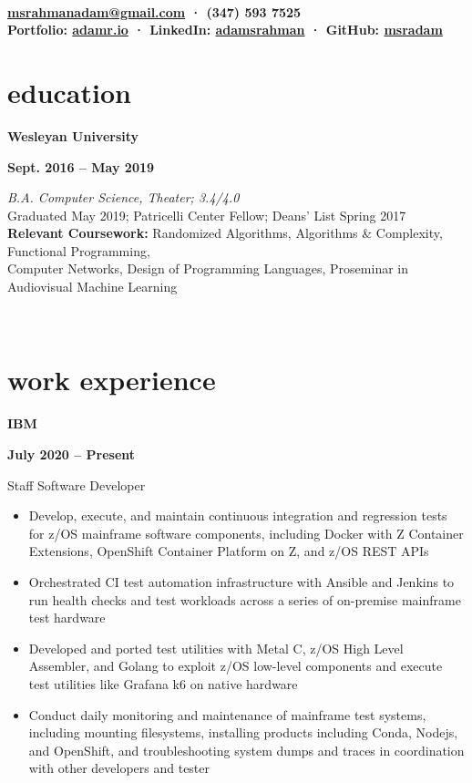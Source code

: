 \documentclass[letterpaper, 10.5pt]{article}
\author{Adam M. Rahman}
\makeatletter
\renewcommand{\maketitle}{
	\hspace{.125\textwidth}
	\begin{minipage}[t]{.75\textwidth}
    \begin{center}
        \fontsize{15pt}{15pt}\selectfont\bfseries \theauthor \\
        \fontsize{10pt}{15pt}\selectfont\normalfont
        \vspace{-0.5mm}
        \href{mailto:munawaradamr@gmail.com}{msrahmanadam@gmail.com} · (347) 593 7525 \\
        \vspace{-0.5mm}
        Portfolio: \href{https://adamr.io}{adamr.io} · 
        LinkedIn: \href{https://www.linkedin.com/in/adamsrahman/}{adamsrahman} · 
        GitHub: \href{https://github.com/msradam}{msradam}  \\ 
        \end{center}
    \end{minipage}}
\newcommand{\eduentry}[4]{
        \begin{minipage}[b]{0.5\textwidth}
        \raggedright
        \bf\large #2
        \end{minipage}%
        \begin{minipage}[b]{0.5\textwidth}
        \raggedleft
        \bf #1
        \end{minipage}

    \begin{minipage}[t]{.80\linewidth}
    \vspace{-3mm}
    \textit{#3} \small{#4}
    \end{minipage}\\
    \vspace{1mm}
    }
\newcommand{\expentry}[5]{

    \begin{minipage}[b]{0.5\textwidth}
        \raggedright
        \bf\large #3
        \end{minipage}%
        \begin{minipage}[b]{0.5\textwidth}
        \raggedleft
        \bf {#1} -- {#2}
        \end{minipage}

    \begin{minipage}[t]{\linewidth}
    \vspace{-3mm}
    #4
    \vspace{-1.75mm}
    \small{#5}
    \end{minipage}\\
    \vspace{1mm}
    }
\makeatother
\begin{document}
    \maketitle
    \vspace{.075cm}


    \section{education}
    \eduentry{Sept. 2016 -- May 2019}
    {Wesleyan University}
    {B.A. Computer Science, Theater; 3.4/4.0}
    {\\ Graduated May 2019; Patricelli Center Fellow; Deans' List Spring 2017\\
    \textbf{Relevant Coursework:} Randomized Algorithms, Algorithms \& Complexity, Functional Programming, \\ Computer Networks, Design of Programming Languages, Proseminar in Audiovisual Machine Learning}

    \section{work experience}
    \expentry{July 2020}
    {Present}
    {IBM}
    {Staff Software Developer}
    {
        \begin{itemize}
          \setlength\itemsep{-0.5mm}
            \item Develop, execute, and maintain continuous integration and regression tests
            for z/OS mainframe software components, including Docker with Z Container
            Extensions, OpenShift Container Platform on Z, and z/OS REST APIs
            \item Orchestrated CI test automation infrastructure with Ansible and Jenkins to run
            health checks and test workloads across a series of on-premise mainframe
            test hardware
            \item Developed and ported test utilities with Metal C, z/OS High Level Assembler, and Golang to exploit z/OS low-level components and execute test utilities like Grafana k6 on native hardware
            \item Conduct daily monitoring and maintenance of mainframe test systems,
            including mounting filesystems, installing products including Conda, Nodejs,
            and OpenShift, and troubleshooting system dumps and traces in coordination
            with other developers and tester
        \end{itemize}
        
    }
\end{document}
